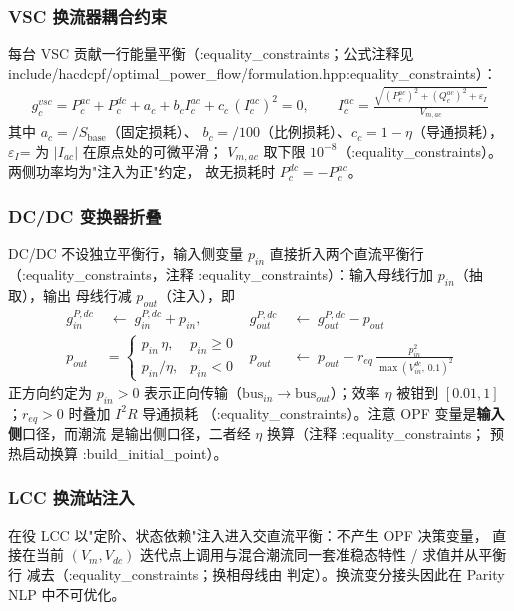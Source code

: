 \subsubsection*{VSC 换流器耦合约束}
每台 VSC 贡献一行能量平衡（:equality\_constraints；公式注释见
include/hacdcpf/optimal\_power\_flow/formulation.hpp:equality\_constraints）：
\begin{align*}
g^{vsc}_c=P^{ac}_c+P^{dc}_c+a_c+b_c I^{ac}_c+c_c\,(I^{ac}_c)^2=0,\qquad
I^{ac}_c=\frac{\sqrt{(P^{ac}_c)^2+(Q^{ac}_c)^2+\varepsilon_I}}{V_{m,ac}}
\end{align*}
其中 $a_c=$$/S_{\mathrm{base}}$（固定损耗）、
$b_c=$$/100$（比例损耗）、$c_c=1-\eta$（导通损耗），
$\varepsilon_I$= 为 $|I_{ac}|$ 在原点处的可微平滑；
$V_{m,ac}$ 取下限 $10^{-8}$（:equality\_constraints）。两侧功率均为"注入为正"约定，
故无损耗时 $P^{dc}_c=-P^{ac}_c$。

\subsubsection*{DC/DC 变换器折叠}
DC/DC 不设独立平衡行，输入侧变量 $p_{in}$ 直接折入两个直流平衡行
（:equality\_constraints，注释 :equality\_constraints）：输入母线行加 $p_{in}$（抽取），输出
母线行减 $p_{out}$（注入），即
\begin{align*}
g^{P,dc}_{in}&\;\leftarrow\;g^{P,dc}_{in}+p_{in},
&g^{P,dc}_{out}&\;\leftarrow\;g^{P,dc}_{out}-p_{out}\\
p_{out}&=\begin{cases}p_{in}\,\eta,&p_{in}\ge 0\\ p_{in}/\eta,&p_{in}<0\end{cases}
&p_{out}&\;\leftarrow\;p_{out}-r_{eq}\,\frac{p_{in}^2}{\max(V^{dc}_{in},\,0.1)^2}
\end{align*}
正方向约定为 $p_{in}>0$ 表示正向传输（$\mathrm{bus}_{in}\to\mathrm{bus}_{out}$）；效率
$\eta$ 被钳到 $[0.01,1]$；$r_{eq}>0$ 时叠加 $I^2R$ 导通损耗
（:equality\_constraints）。注意 OPF 变量是\textbf{输入侧}口径，而潮流
 是输出侧口径，二者经 $\eta$ 换算（注释 :equality\_constraints；
预热启动换算 :build\_initial\_point）。

\subsubsection*{LCC 换流站注入}
在役 LCC 以"定阶、状态依赖"注入进入交直流平衡：不产生 OPF 决策变量，
直接在当前 $(V_m,V_{dc})$ 迭代点上调用与混合潮流同一套准稳态特性
/ 求值并从平衡行
减去（:equality\_constraints；换相母线由  判定）。换流变分接头因此在 Parity NLP 中不可优化。

